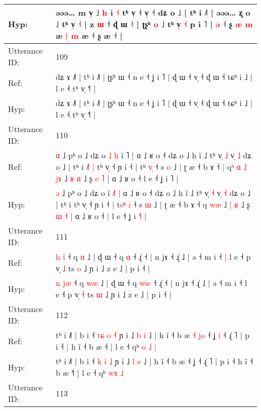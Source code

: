 \documentclass[10pt]{article}
\DeclareRobustCommand{\hl}[1]{{\textcolor{red}{#1}}}
\begin{document}
\begin{longtable}{ll}
 \\
Hyp: & əəə… m v̩ ˩ \hl{h} i\hl{}\hl{} \hl{˧} tʰ v̩ ˧ v̩ ˧ dʑ o ˩ | tʰ i ˩˥ | əəə… ʐ o ˩ tʰ v̩ \hl{}\hl{˧} | z \hl{ɯ} ˧ ɖ ɯ \hl{˧} | ʈʂʰ \hl{}\hl{o} ˩ tʰ v̩ \hl{˧} p i ˥ | \hl{ə} ˧ ʂ\hl{ }\hl{æ}\hl{ }\hl{m} æ\hl{ }\hl{|} \hl{m} æ ˧ ʂ æ ˧ |
 \\
\midrule
Utterance ID: & 109 \\
Ref: & dʑ ɤ ˩˥ | tʰ i ˩˥ | ʈʂʰ ɯ ˧ n e ˧ ʝ i ˥ | ɖ ɯ ˧ v̩ ˧ ɖ ɯ ˧ tɕʰ i ˩ | l e ˧ tʰ v̩ ˧˥ |
 \\
Hyp: & dʑ ɤ ˩˥ | tʰ i ˩˥ | ʈʂʰ ɯ ˧ n e ˧ ʝ i ˥ | ɖ ɯ ˧ v̩ ˧ ɖ ɯ ˧ tɕʰ i ˩ | l e ˧ tʰ v̩ ˧˥ |
 \\
\midrule
Utterance ID: & 110 \\
Ref: & \hl{ɑ} ˩ pʰ o ˩ dʑ o\hl{ }\hl{˩}\hl{ }\hl{h} ĩ \hl{}˥ | ɑ ˩ ʁ o ˧ dʑ o ˩ h ĩ ˩ tʰ v̩ \hl{˩} v̩ \hl{˩} dʑ o ˩ | tʰ i\hl{ }\hl{˩}\hl{˥}\hl{ }\hl{|} tʰ v̩ ˧ ɲ i ˧ | t\hl{}ʰ \hl{v}\hl{̩} ˧ s \hl{o} ˩ | ʈ æ ˧ b ɤ ˧\hl{ }\hl{|} q\hl{ʰ}\hl{ }\hl{ɑ}\hl{ }\hl{˩} \hl{j}\hl{ɤ} ˩ \hl{ʁ} \hl{ɑ} ˩ ʂ \hl{e} \hl{˥} | ɑ ˩ ʁ o ˧\hl{}\hl{} l e ˧ ʝ i \hl{}˥ |
 \\
Hyp: & \hl{ə} ˩ pʰ o ˩ dʑ o\hl{}\hl{}\hl{}\hl{} ĩ \hl{˩}˥ | ɑ ˩ ʁ o ˧ dʑ o ˩ h ĩ ˩ tʰ v̩ \hl{˧} v̩ \hl{˧} dʑ o ˩ | tʰ i\hl{}\hl{}\hl{}\hl{}\hl{} tʰ v̩ ˧ ɲ i ˧ | t\hl{s}ʰ \hl{}\hl{i} ˧ s \hl{ɯ} ˩ | ʈ æ ˧ b ɤ ˧\hl{}\hl{} q\hl{}\hl{}\hl{}\hl{}\hl{} \hl{w}\hl{æ} ˩ \hl{|} \hl{ʁ} ˩ ʂ \hl{ɯ} \hl{˧} | ɑ ˩ ʁ o ˧\hl{ }\hl{|} l e ˧ ʝ i \hl{˧}˥ |
 \\
\midrule
Utterance ID: & 111 \\
Ref: & \hl{h} \hl{i}\hl{̃} ˧ q \hl{}\hl{ɑ} ˩ | ɖ ɯ ˧ q \hl{}\hl{ɑ} ˧ ɻ̍ ˧ | n jɤ ˧ ɻ̍ ˩ | ə ˧ m i ˧\hl{ }\hl{|} l e ˧ p v̩ \hl{˩} ts \hl{o} ˩ ɲ i ˩ z e ˩ | p i ˧ |
 \\
Hyp: & \hl{n} \hl{j}\hl{æ} ˧ q \hl{w}\hl{æ} ˩ | ɖ ɯ ˧ q \hl{w}\hl{æ} ˧ ɻ̍ ˧ | n jɤ ˧ ɻ̍ ˩ | ə ˧ m i ˧\hl{}\hl{} l e ˧ p v̩ \hl{˧} ts \hl{ɯ} ˩ ɲ i ˩ z e ˩ | p i ˧ |
 \\
\midrule
Utterance ID: & 112 \\
Ref: & tʰ i ˩˥ | b i ˧ \hl{t}\hl{ɕ} \hl{o} \hl{˧} ɲ i ˩ \hl{b} \hl{i} ˩ | h ĩ ˧ b æ\hl{ }\hl{˧}\hl{ }\hl{j}\hl{o} ˧ ʝ\hl{ }\hl{i} ˧ ɻ̍ ˥ | p i ˧\hl{ }\hl{|} h ĩ ˧ b æ ˧\hl{} | l e ˧ qʰ \hl{o}\hl{ }\hl{˩} \hl{|}
 \\
Hyp: & tʰ i ˩˥ | b i ˧ \hl{}\hl{k} \hl{i} \hl{˩} ɲ i ˩ \hl{l} \hl{e} ˩ | h ĩ ˧ b æ\hl{}\hl{}\hl{}\hl{}\hl{} ˧ ʝ\hl{}\hl{} ˧ ɻ̍ ˥ | p i ˧\hl{}\hl{} h ĩ ˧ b æ ˧\hl{˥} | l e ˧ qʰ \hl{}\hl{w}\hl{ɤ} \hl{˩}
 \\
\midrule
Utterance ID: & 113 \\

\end{longtable}
\end{document}
